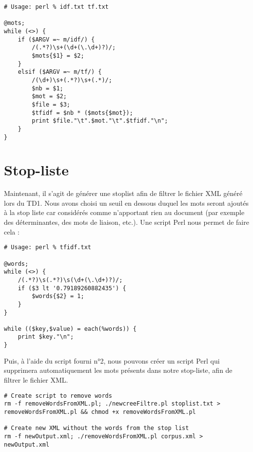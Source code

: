 \begin{lstlisting}
# Usage: perl % idf.txt tf.txt

@mots;
while (<>) {
    if ($ARGV =~ m/idf/) {
        /(.*?)\s+(\d+(\.\d+)?)/;
        $mots{$1} = $2;
    }
    elsif ($ARGV =~ m/tf/) {
        /(\d+)\s+(.*?)\s+(.*)/;
        $nb = $1;
        $mot = $2;
        $file = $3;
        $tfidf = $nb * ($mots{$mot});
        print $file."\t".$mot."\t".$tfidf."\n";
    }
}
\end{lstlisting}
\fakeshell

\section{Stop-liste}

Maintenant, il s'agit de générer une stoplist afin de filtrer le fichier XML généré lors du TD1. Nous avons choisi un seuil en dessous duquel les mots seront ajoutés à la stop liste car considérés comme n'apportant rien au document (par exemple des déterminantes, des mots de liaison, etc.). Une script Perl nous permet de faire cela :

\perl
\begin{lstlisting}
# Usage: perl % tfidf.txt

@words;
while (<>) {
    /(.*?)\s(.*?)\s(\d+(\.\d+)?)/;
    if ($3 lt '0.79189260882435') {
        $words{$2} = 1;
    }
}

while (($key,$value) = each(%words)) {
    print $key."\n";
}
\end{lstlisting}

Puis, à l'aide du script fourni n°2, nous pouvons créer un script Perl qui supprimera automatiquement les mots présents dans notre stop-liste, afin de filtrer le fichier XML.

\fakeshell
\begin{lstlisting}
# Create script to remove words
rm -f removeWordsFromXML.pl; ./newcreeFiltre.pl stoplist.txt > removeWordsFromXML.pl && chmod +x removeWordsFromXML.pl

# Create new XML without the words from the stop list
rm -f newOutput.xml; ./removeWordsFromXML.pl corpus.xml > newOutput.xml
\end{lstlisting}


